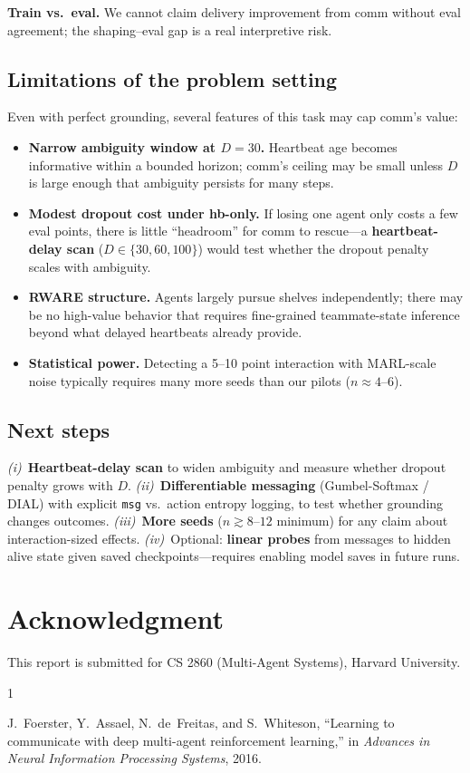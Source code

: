 \documentclass[conference,onecolumn]{IEEEtran}
\begin{document}
\textbf{Train vs.\ eval.} We cannot claim delivery improvement from comm without eval agreement; the shaping--eval gap is a real interpretive risk.

\subsection{Limitations of the problem setting}

Even with perfect grounding, several features of this task may cap comm's value:

\begin{itemize}
  \item \textbf{Narrow ambiguity window at $D{=}30$.} Heartbeat age becomes informative within a bounded horizon; comm's ceiling may be small unless $D$ is large enough that ambiguity persists for many steps.
  \item \textbf{Modest dropout cost under hb-only.} If losing one agent only costs a few eval points, there is little ``headroom'' for comm to rescue---a \textbf{heartbeat-delay scan} ($D\in\{30,60,100\}$) would test whether the dropout penalty scales with ambiguity.
  \item \textbf{RWARE structure.} Agents largely pursue shelves independently; there may be no high-value behavior that requires fine-grained teammate-state inference beyond what delayed heartbeats already provide.
  \item \textbf{Statistical power.} Detecting a 5--10 point interaction with MARL-scale noise typically requires many more seeds than our pilots ($n{\approx}4$--$6$).
\end{itemize}

\subsection{Next steps}

\textit{(i)}~\textbf{Heartbeat-delay scan} to widen ambiguity and measure whether dropout penalty grows with $D$. \textit{(ii)}~\textbf{Differentiable messaging} (Gumbel-Softmax / DIAL) with explicit \texttt{msg} vs.\ action entropy logging, to test whether grounding changes outcomes. \textit{(iii)}~\textbf{More seeds} ($n{\gtrsim}8$--$12$ minimum) for any claim about interaction-sized effects. \textit{(iv)}~Optional: \textbf{linear probes} from messages to hidden alive state given saved checkpoints---requires enabling model saves in future runs.

\section*{Acknowledgment}

This report is submitted for CS 2860 (Multi-Agent Systems), Harvard University.


\begin{thebibliography}{1}

J.~Foerster, Y.~Assael, N.~de~Freitas, and S.~Whiteson, ``Learning to communicate with deep multi-agent reinforcement learning,'' in \emph{Advances in Neural Information Processing Systems}, 2016.

\end{thebibliography}
\end{document}
